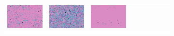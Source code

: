 \documentclass{ipol}
\begin{document}
\begin{figure}[ht]
\begin{subfigure}[t]{\linewidth}
\begin{tabular}{ccccccccc}
                \includegraphics[width=\s]{images/tower/DCB/iso_n5_64_grids.png}&
                \includegraphics[width=\s]{images/tower/DHT/iso_n5_64_grids.png}&
                \includegraphics[width=\s]{images/tower/LINEAR/iso_n5_64_grids.png}&

\end{tabular}
\end{subfigure}
\end{figure}
\end{document}
